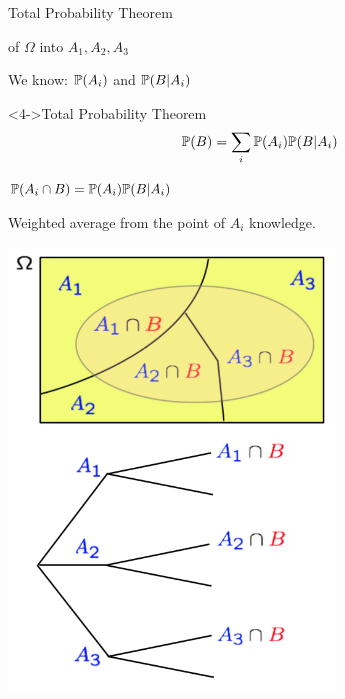 \begin{frame}{Total Probability Theorem}

{
\plitemsep 0.1in
\bci 

\item<1->  of $\Omega$ into $A_1,A_2,A_3$

\item<2-> We know: $\mathbb{P}( A_i )$ and $\mathbb{P}( B | A_i )$ 

\item<3-> 


\begin{block}<4->{Total Probability Theorem}
$$
\mathbb{P}( B ) = \sum_{i} \mathbb{P}( A_i ) \mathbb{P}( B | A_i )
$$
\end{block}

\item<4-> $\mathbb{P}( A_i \cap B ) = \mathbb{P}( A_i ) \mathbb{P}( B | A_i )$

\item<5-> Weighted average from the point of $A_i$ knowledge. 
\eci 
}
{
\centering
\includegraphics[width=0.65\textwidth]{L2_total_ex.png}
}

\end{frame}

